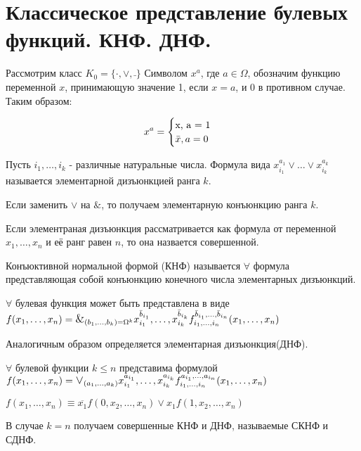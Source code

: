 \section {Классическое представление булевых функций. КНФ. ДНФ.}

Рассмотрим класс $K_0 = \{ \cdot , \vee , \bar{ }\}$
Символом $x^a$, где $a \in \Omega $, обозначим функцию переменной $x$, принимающую значение 1, если $x = a$, и 0 в противном случае. Таким образом:
\begin{center}
	\begin{equation*}
		x^a =
		\begin{cases}
   			$x, a = 1$
			\\
			\bar{x},a = 0
 		\end{cases}
	\end{equation*}
\end{center}

\opr
Пусть $i_1, \dotsc, i_k$ - различные натуральные числа. Формула вида $x_{i_1}^{a_1} \vee \dotsc \vee x_{i_k}^{a_k}$ называется элементарной дизъюнкцией ранга $k$.\par Если заменить $\vee$ на $\&$, то получаем элементарную конъюнкцию ранга $k$. \par Если элементраная дизъюнкция рассматривается как формула от переменной $x_1, \dotsc,x_n$ и её ранг равен $n$, то она назвается совершенной.

\opr Конъюктивной нормальной формой (КНФ) называется $\forall$ формула представляющая собой конъюнкцию конечного числа элементарных дизъюнкций.

\thr $\forall$ булевая функция может быть представлена в виде $f(x_1, \dotsc, x_n) = \mathlarger{\mathlarger{\text{\&}}} _{(b_1, \dotsc, b_k) = \Omega^k} x_{i_1}^{\bar{b}_{i_1}},\dotsc,x_{i_k}^{\bar{b}_{i_k}}f_{i_1, \dotsc, i_n}^{\bar{b}_{i_1},\dotsc,\bar{b}_{i_n}}(x_1,\dotsc,x_n)$ %

\note Аналогичным образом определяется элементарная дизъюнкция(ДНФ).

\thr $\forall$ булевой функции $k\leq n$ представима формулой $f(x_1,\dotsc,x_n) = \mathlarger{\mathlarger{\vee}} _{(a_1, \dotsc, a_k)} x_{i_1}^{a_{i_1}},\dotsc,x_{i_k}^{a_{i_k}}f_{i_1, \dotsc, i_n}^{a_{i_1},\dotsc,a_{i_n}}(x_1,\dotsc,x_n)$ %

\conseq $f(x_1,\dotsc,x_n) \equiv \overline{x_1}f(0,x_2,\dotsc,x_n) \vee x_1f(1, x_2, \dotsc, x_n)$

В случае $k = n$ получаем совершенные КНФ и ДНФ, называемые СКНФ и СДНФ.

